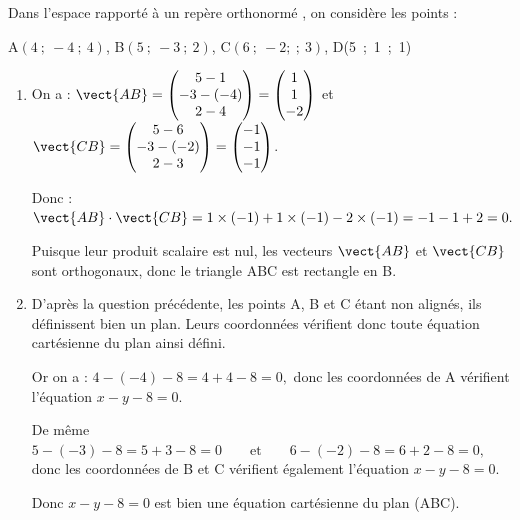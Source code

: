 \smallskip

Dans l'espace rapporté à un repère orthonormé \Oijk, on considère les points :
\begin{center}
A$(4~;~-4~;~4)$, \quad B$(5~;~-3~;~2)$, \quad C$(6~;~- 2;~;~3)$, \quad D(5~;~1~;~1)
\end{center}

\begin{enumerate}
	\item On a : $\vect{AB} = \begin{pmatrix}5-1\\-3-(-4)\\2-4\end{pmatrix} = \begin{pmatrix}1\\1\\-2\end{pmatrix}$ et $\vect{CB} = \begin{pmatrix}5-6\\-3-(-2)\\2-3\end{pmatrix} = \begin{pmatrix}-1\\-1\\-1\end{pmatrix}$.

Donc :
$\vect{AB} \cdot \vect{CB} = 1 \times (-1) + 1 \times (-1) - 2 \times (-1) = -1 -1 + 2 = 0.$

\smallskip

Puisque leur produit scalaire est nul, les vecteurs $\vect{AB}$ et $\vect{CB}$ sont orthogonaux, donc le triangle ABC est rectangle en B.

	\item D'après la question précédente, les points A, B et C étant non alignés, ils définissent bien un plan. Leurs coordonnées vérifient donc toute équation cartésienne du plan ainsi défini.

Or on a :
$4-(-4)-8 = 4 + 4 - 8 = 0,$
donc les coordonnées de A vérifient l'équation $x - y  - 8 = 0$.
	
De même
$5 - (-3) - 8 = 5 + 3 - 8 = 0 \qquad \text{et} \qquad 6 - (-2) - 8 = 6 + 2 - 8 = 0,$
donc les coordonnées de B et C vérifient également l'équation $x - y - 8 = 0$.

Donc \quad $x - y - 8 = 0$ \quad est bien une équation cartésienne du plan (ABC).


\end{enumerate}
